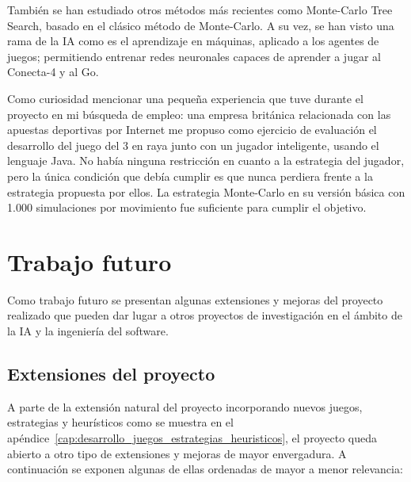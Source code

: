 También se han estudiado otros métodos más recientes como Monte-Carlo Tree Search, basado en el clásico método de Monte-Carlo.
A su vez, se han visto una rama de la IA como es el aprendizaje en máquinas, aplicado a los agentes de juegos; permitiendo entrenar redes neuronales capaces de aprender a jugar al Conecta-4 y al Go.

Como curiosidad mencionar una pequeña experiencia que tuve durante el proyecto en mi búsqueda de empleo: una empresa británica relacionada con las apuestas deportivas por Internet me propuso como ejercicio de evaluación el desarrollo del juego del 3 en raya junto con un jugador inteligente, usando el lenguaje Java.
No había ninguna restricción en cuanto a la estrategia del jugador, pero la única condición que debía cumplir es que nunca perdiera frente a la estrategia propuesta por ellos.
La estrategia Monte-Carlo en su versión básica con 1.000 simulaciones por movimiento fue suficiente para cumplir el objetivo.

\section{Trabajo futuro}
\label{sec:trabajo_futuro}
Como trabajo futuro se presentan algunas extensiones y mejoras del proyecto realizado que pueden dar lugar a otros proyectos de investigación en el ámbito de la IA y la ingeniería del software.

\subsection{Extensiones del proyecto}
\label{ssec:extensiones_proyecto}
A parte de la extensión natural del proyecto incorporando nuevos juegos, estrategias y heurísticos como se muestra en el apéndice~\ref{cap:desarrollo_juegos_estrategias_heuristicos}, el proyecto queda abierto a otro tipo de extensiones y mejoras de mayor envergadura.
A continuación se exponen algunas de ellas ordenadas de mayor a menor relevancia:

